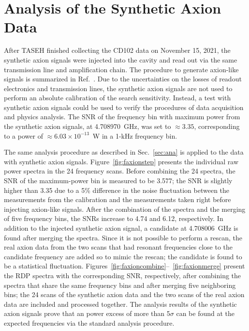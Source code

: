 \section{Analysis of the Synthetic Axion Data}\label{sec:faxion}
After TASEH finished collecting the CD102 data on November 15, 2021, 
the synthetic axion signals were injected into the cavity and read out via the 
same transmission line and amplification chain. The procedure 
to generate axion-like signals is summarized in 
Ref.~\cite{TASEHInstrumentation}. 
Due to the uncertainties on the losses of readout electronics and transmission
 lines, the synthetic axion signals are not used to perform an absolute 
calibration of the search sensitivity. Instead, 
a test with synthetic axion signals could be used to verify the procedures of 
data acquisition and physics analysis. The 
SNR of the frequency bin with maximum power from the 
synthetic axion signals, at 4.708970~GHz, was set to $\approx 3.35$, 
corresponding to a power of $\approx 6.03 \times 10^{-13}$~W in a 1-kHz 
frequency bin.  

The same analysis procedure as described in Sec.~\ref{sec:ana} is applied 
to the data with synthetic axion signals. 
Figure~\ref{fig:faxionstep} presents the individual raw power spectra in 
the 24 frequency scans. Before combining 
the 24 spectra, the SNR of the maximum-power bin is measured to be 
3.577; the SNR is slightly higher than 3.35 due to a 
5\% difference in the noise fluctuation between the measurements from 
the calibration and the measurements taken 
right before injecting axion-like signals. After the combination 
of the spectra and the merging of five frequency 
bins, the SNRs increase to 4.74 and 6.12, respectively. In addition to the 
injected synthetic axion signal, a candidate at 4.708006~GHz is found after 
merging the spectra. Since it is not possible to perform a rescan, 
the real axion data from the two scans that had resonant frequencies close to 
the candidate frequency are added so to mimic the rescan; the candidate is 
found to be a statistical fluctuation.  
Figures~\ref{fig:faxioncombine}--~\ref{fig:faxionmerge} present 
the RDP spectra with the corresponding SNR, respectively, after combining 
the spectra that share the same frequency bins and after merging five 
neighboring bins; the 24 scans of the synthetic axion data and the two 
scans of the real axion data are included and processed together. 
The analysis results of the synthetic axion signals prove that an power 
excess of more than 5$\sigma$ can be found at the expected frequencies via 
the standard analysis procedure.  

